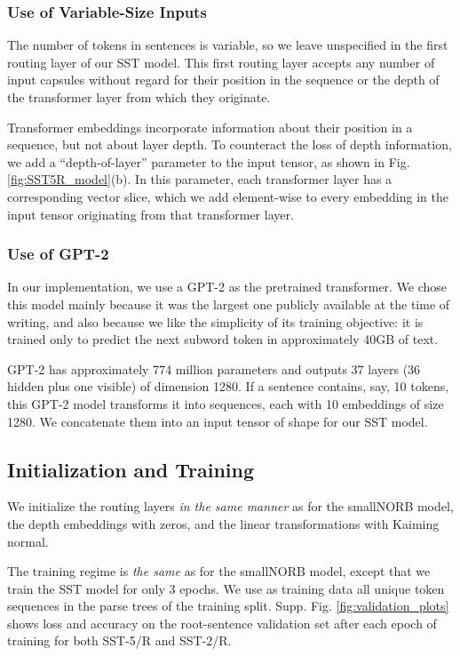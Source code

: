 \documentclass[11pt,a4paper]{article}
\begin{document}
\subsubsection{Use of Variable-Size Inputs}

The number of tokens in sentences is variable, so we leave  unspecified in the first routing layer of our SST model. This first routing layer accepts any number of input capsules without regard for their position in the sequence or the depth of the transformer layer from which they originate.

Transformer embeddings incorporate information about their position in a sequence, but not about layer depth. To counteract the loss of depth information, we add a ``depth-of-layer'' parameter to the input tensor, as shown in Fig. \ref{fig:SST5R_model}(b). In this parameter, each transformer layer has a corresponding vector slice, which we add element-wise to every embedding in the input tensor originating from that transformer layer.

\subsubsection{Use of GPT-2}

In our implementation, we use a GPT-2 \cite{GPT-2-Radford-et-al} as the pretrained transformer. We chose this model mainly because it was the largest one publicly available at the time of writing, and also because we like the simplicity of its training objective: it is trained only to predict the next subword token in approximately 40GB of text.

GPT-2 has approximately 774 million parameters and outputs 37 layers (36 hidden plus one visible) of dimension 1280. If a sentence contains, say, 10 tokens, this GPT-2 model transforms it into  sequences, each with 10 embeddings of size 1280. We concatenate them into an input tensor of shape  for our SST model.

\subsection{Initialization and Training}

We initialize the routing layers {\em in the same manner} as for the smallNORB model, the depth embeddings with zeros, and the linear transformations with Kaiming normal.

The training regime is {\em the same} as for the smallNORB model, except that we train the SST model for only 3 epochs. We use as training data all unique token sequences in the parse trees of the training split.  Supp. Fig. \ref{fig:validation_plots} shows loss and accuracy on the root-sentence validation set after each epoch of training for both SST-5/R and SST-2/R.
\end{document}
